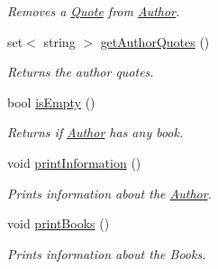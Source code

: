 \begin{DoxyCompactItemize}
\begin{DoxyCompactList}\small\item\em Removes a \hyperlink{class_quote}{Quote} from \hyperlink{class_author}{Author}. \end{DoxyCompactList}\item 
set$<$ string $>$ \hyperlink{class_author_a81435140eb694eb7ed54ea567aa38984}{get\+Author\+Quotes} ()
\begin{DoxyCompactList}\small\item\em Returns the author quotes. \end{DoxyCompactList}\item 
bool \hyperlink{class_author_ab0752a3f061a07c6460e52e4386ea5c3}{is\+Empty} ()
\begin{DoxyCompactList}\small\item\em Returns if \hyperlink{class_author}{Author} has any book. \end{DoxyCompactList}\item 
void \hyperlink{class_author_a9dff52e2a8bd67ff4509eb00f9235155}{print\+Information} ()
\begin{DoxyCompactList}\small\item\em Prints information about the \hyperlink{class_author}{Author}. \end{DoxyCompactList}\item 
void \hyperlink{class_author_a108714e7e120b05eaf431bb4a55b9383}{print\+Books} ()
\begin{DoxyCompactList}\small\item\em Prints information about the Books. \end{DoxyCompactList}\end{DoxyCompactItemize}

